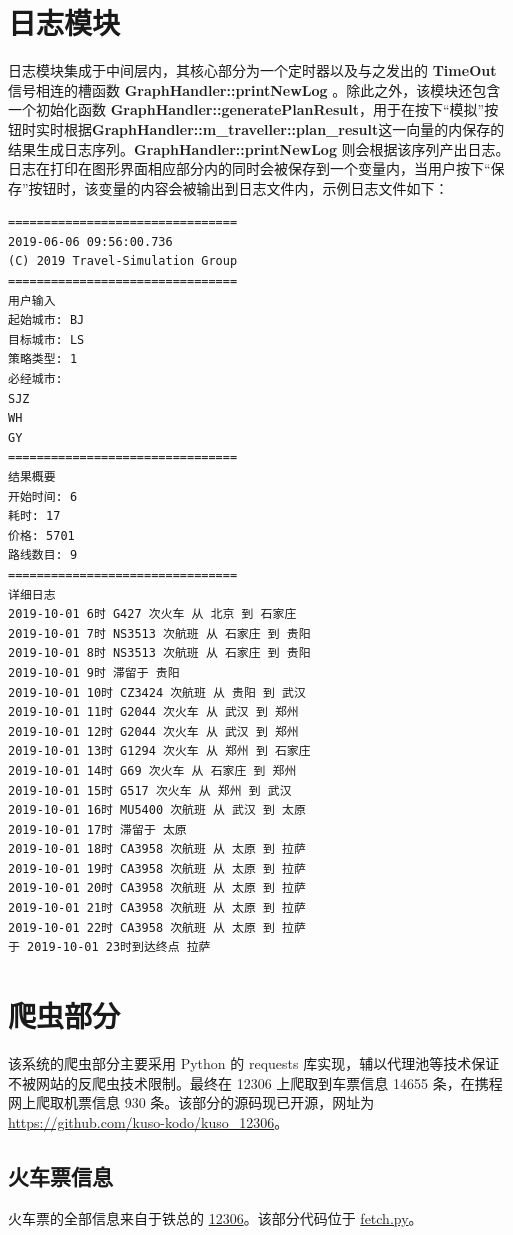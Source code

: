\documentclass[lang=cn,blue]{elegantbook}
\begin{document}
\chapter{日志模块}
日志模块集成于中间层内，其核心部分为一个定时器以及与之发出的 \textbf{TimeOut} 信号相连的槽函数 \textbf{GraphHandler::printNewLog
}。除此之外，该模块还包含一个初始化函数 \textbf{GraphHandler::generatePlanResult}，用于在按下``模拟''按钮时实时根据\textbf{GraphHandler::m\_traveller::plan\_result}这一向量的内保存的结果生成日志序列。\textbf{GraphHandler::printNewLog} 则会根据该序列产出日志。日志在打印在图形界面相应部分内的同时会被保存到一个变量内，当用户按下``保存''按钮时，该变量的内容会被输出到日志文件内，示例日志文件如下：

\begin{lstlisting}
================================
2019-06-06 09:56:00.736    
(C) 2019 Travel-Simulation Group
================================
用户输入
起始城市: BJ
目标城市: LS
策略类型: 1
必经城市:
SJZ
WH
GY
================================
结果概要
开始时间: 6
耗时: 17
价格: 5701
路线数目: 9
================================
详细日志
2019-10-01 6时 G427 次火车 从 北京 到 石家庄
2019-10-01 7时 NS3513 次航班 从 石家庄 到 贵阳
2019-10-01 8时 NS3513 次航班 从 石家庄 到 贵阳
2019-10-01 9时 滞留于 贵阳
2019-10-01 10时 CZ3424 次航班 从 贵阳 到 武汉
2019-10-01 11时 G2044 次火车 从 武汉 到 郑州
2019-10-01 12时 G2044 次火车 从 武汉 到 郑州
2019-10-01 13时 G1294 次火车 从 郑州 到 石家庄
2019-10-01 14时 G69 次火车 从 石家庄 到 郑州
2019-10-01 15时 G517 次火车 从 郑州 到 武汉
2019-10-01 16时 MU5400 次航班 从 武汉 到 太原
2019-10-01 17时 滞留于 太原
2019-10-01 18时 CA3958 次航班 从 太原 到 拉萨
2019-10-01 19时 CA3958 次航班 从 太原 到 拉萨
2019-10-01 20时 CA3958 次航班 从 太原 到 拉萨
2019-10-01 21时 CA3958 次航班 从 太原 到 拉萨
2019-10-01 22时 CA3958 次航班 从 太原 到 拉萨
于 2019-10-01 23时到达终点 拉萨
\end{lstlisting}

\chapter{爬虫部分}
该系统的爬虫部分主要采用 Python 的 requests 库实现，辅以代理池等技术保证不被网站的反爬虫技术限制。最终在 12306 上爬取到车票信息 14655 条，在携程网上爬取机票信息 930 条。该部分的源码现已开源，网址为 \href{https://github.com/kuso-kodo/kuso\_12306}{https://github.com/kuso-kodo/kuso\_12306}。

\section{火车票信息}
火车票的全部信息来自于铁总的 \href{https://www.12306.cn}{12306}。该部分代码位于 \href{https://github.com/kuso-kodo/kuso_12306/blob/master/src_12306/fetch.py}{fetch.py}。
\end{document}
